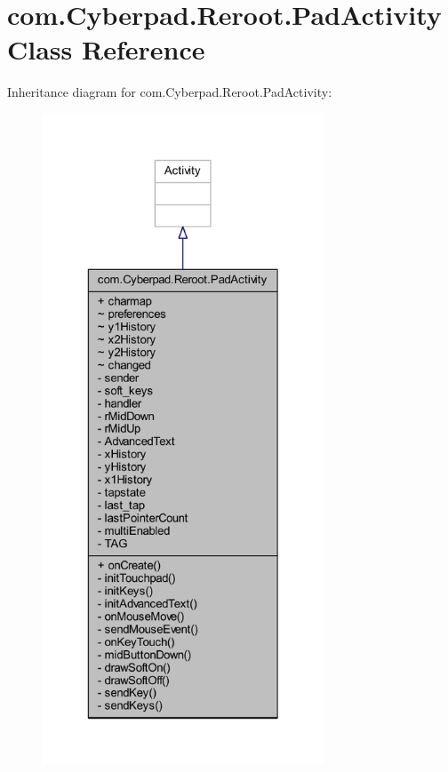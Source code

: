 \hypertarget{classcom_1_1_cyberpad_1_1_reroot_1_1_pad_activity}{
\section{com.\-Cyberpad.\-Reroot.\-Pad\-Activity \-Class \-Reference}
\label{classcom_1_1_cyberpad_1_1_reroot_1_1_pad_activity}
}


\-Inheritance diagram for com.\-Cyberpad.\-Reroot.\-Pad\-Activity\-:\nopagebreak
\begin{figure}[H]
\begin{center}
\leavevmode
\includegraphics[height=550pt]{classcom_1_1_cyberpad_1_1_reroot_1_1_pad_activity__inherit__graph}
\end{center}
\end{figure}


